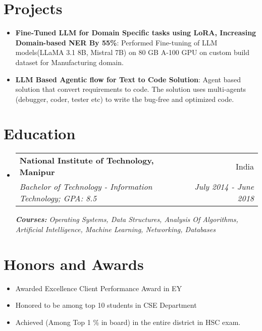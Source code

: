 \documentclass[a4paper,12pt]{article}
\makeatletter
\newcommand{\resumeItem}[2]{
  \item\small{
    \textbf{#1}{: #2 \vspace{-2pt}}
  }
}
\newcommand{\resumeSubheading}[4]{
  \vspace{-1pt}\item
    \begin{tabular*}{0.97\textwidth}{l@{\extracolsep{\fill}}r}
      \textbf{#1} & #2 \\
      \textit{#3} & \textit{#4} \\
    \end{tabular*}\vspace{-5pt}
}
\newcommand{\resumeSubItem}[2]{\resumeItem{#1}{#2}\vspace{-3pt}}
\newcommand{\resumeSubHeadingListStart}{\begin{itemize}[leftmargin=*]}
\newcommand{\resumeSubHeadingListEnd}{\end{itemize}}
\makeatother
\begin{document}
\vspace{-5pt}
\section{Projects}
\resumeSubHeadingListStart
\resumeSubItem{Fine-Tuned LLM for Domain Specific tasks using LoRA, Increasing Domain-based NER By 55\%}{Performed Fine-tuning of LLM models(LLaMA 3.1 8B, Mistral 7B) on 80 GB A-100 GPU on custom build dataset for Manufacturing domain.}
\vspace{2pt}
\resumeSubItem{LLM Based Agentic flow for Text to Code Solution}{Agent based solution that convert requirements to code. The solution uses multi-agents (debugger, coder, tester etc) to write the bug-free and optimized code.}
\vspace{2pt}
\resumeSubHeadingListEnd

\section{Education}
  \resumeSubHeadingListStart
    \resumeSubheading
      {National Institute of Technology, Manipur}{India}
      {Bachelor of Technology - Information Technology; GPA: 8.5}{July 2014 - June 2018}
      {\scriptsize \textit{ \footnotesize{\newline{}\textbf{Courses:} Operating Systems, Data Structures, Analysis Of Algorithms, Artificial Intelligence, Machine Learning, Networking, Databases}}}
  \resumeSubHeadingListEnd

\section{Honors and Awards}
\resumeSubHeadingListStart
  \item {Awarded Excellence Client Performance Award in EY}
  \item {Honored to be among top 10 students in CSE Department}
  \item {Achieved (Among Top 1 \% in board) in the entire district in HSC exam.}
\resumeSubHeadingListEnd

\end{document}

